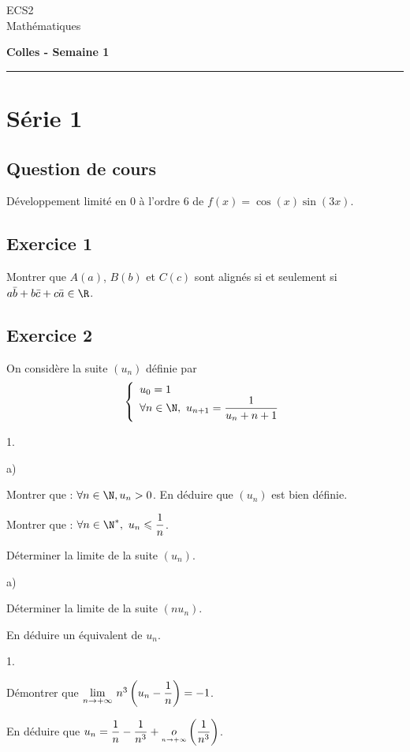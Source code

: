 \documentclass[11pt]{article}%
\begin{document}
\begin{flushleft}
ECS2 \\
Mathématiques
\end{flushleft}

\begin{center}
\textbf{\Large{Colles - Semaine 1}}
\end{center}

\hrule

\vspace*{0,2cm}

\section*{Série 1}
\subsection*{Question de cours}
Développement limité en $0$ à l'ordre $6$ de $f(x)=\cos(x)\sin(3x)$.

\subsection*{Exercice 1}
\noindent
Montrer que $A(a)$, $B(b)$ et $C(c)$ sont alignés si et seulement si 
$a\bar{b} + b\bar{c} + c\bar{a} \in \R$.

\subsection*{Exercice 2}
\noindent
On considère la suite $(u_n)$ définie par 
\[
\left\{
\begin{array}{l}
u_0=1\\
\forall n \in \N, \ u_{n+1} = \dfrac{1}{u_n+n+1}
\end{array}
\right.
\]
\begin{noliste}{1.}
\item \begin{noliste}{a)}
\item Montrer que : $\forall n \in \N, u_n >0$. En déduire que $(u_n)$ 
est bien définie.
\item Montrer que : $  \forall n \in \N^*, \ u_n \leq \dfrac{1}{n}$.
\item Déterminer la limite de la suite $(u_n)$.
\end{noliste}
\item \begin{noliste}{a)}
\item Déterminer la limite de la suite $(nu_n)$.
\item En déduire un équivalent de $u_n$.
\end{noliste}
\item \begin{noliste}{1.}
\item Démontrer que $ {\displaystyle \lim_{n \to + \infty} \ } n^3 \left( u_n 
-\dfrac{1}{n} \right) = -1$.
\item En déduire que $ u_n = \dfrac{1}{n} - \dfrac{1}{n^3} + {\underset {{\overset {n\rightarrow +\infty}{}}}{o}} 
\left( \dfrac{1}{n^3} \right)$.
\end{noliste}
\end{noliste}
\end{document}
